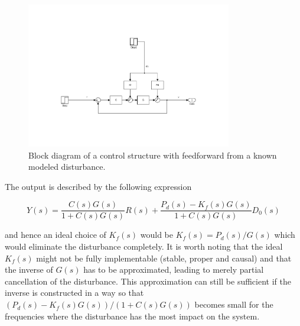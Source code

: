 \begin{figure}[h]
  \centering %
  \includegraphics[width=0.8\textwidth, trim=8cm 4.5cm 5.97cm 8.5cm, clip=true]{fig/matlab/ffdist}
  \caption{\label{fig:ffdist}Block diagram of a control structure with feedforward from a known modeled disturbance.}
\end{figure}

The output is described by the following expression

\begin{equation}
  \label{eq:ffdist}
  Y(s) = \frac{C(s)G(s)}{1+C(s)G(s)}R(s) + \frac{P_d(s) - K_f(s)G(s)}{1+C(s)G(s)}D_0(s)
\end{equation}

and hence an ideal choice of $K_f(s)$ would be $K_f(s)=P_d(s)/G(s)$ which would eliminate the disturbance completely. It is worth noting that the ideal $K_f(s)$ might not be fully implementable (stable, proper and causal) and that the inverse of $G(s)$ has to be approximated, leading to merely partial cancellation of the disturbance. This approximation can still be sufficient if the inverse is constructed in a way so that $(P_d(s) - K_f(s)G(s))/(1+C(s)G(s))$ becomes small for the frequencies where the disturbance has the most impact on the system.


